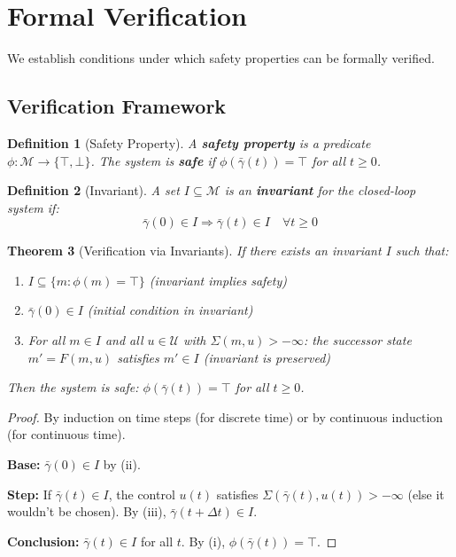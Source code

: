 \documentclass[11pt]{article}
\newtheorem{theorem}{Theorem}[section]
\newtheorem{definition}[theorem]{Definition}
\begin{document}
\section{Formal Verification}

We establish conditions under which safety properties can be formally verified.

\subsection{Verification Framework}

\begin{definition}[Safety Property]
A \textbf{safety property} is a predicate $\phi : \mathcal{M} \to \{\top, \bot\}$. The
system is \textbf{safe} if $\phi(\bar{\gamma}(t)) = \top$ for all $t \geq 0$.
\end{definition}

\begin{definition}[Invariant]
A set $I \subseteq \mathcal{M}$ is an \textbf{invariant} for the closed-loop system if:
\[
\bar{\gamma}(0) \in I \Rightarrow \bar{\gamma}(t) \in I \quad \forall t \geq 0
\]
\end{definition}

\begin{theorem}[Verification via Invariants]
\label{thm:verification}
If there exists an invariant $I$ such that:
\begin{enumerate}
    \item[(i)] $I \subseteq \{m : \phi(m) = \top\}$ (invariant implies safety)
    \item[(ii)] $\bar{\gamma}(0) \in I$ (initial condition in invariant)
    \item[(iii)] For all $m \in I$ and all $u \in \mathcal{U}$ with $\Sigma(m, u) > -\infty$: the successor state $m' = F(m, u)$ satisfies $m' \in I$ (invariant is preserved)
\end{enumerate}
Then the system is safe: $\phi(\bar{\gamma}(t)) = \top$ for all $t \geq 0$.
\end{theorem}

\begin{proof}
By induction on time steps (for discrete time) or by continuous induction (for continuous
time).

\textbf{Base:} $\bar{\gamma}(0) \in I$ by (ii).

\textbf{Step:} If $\bar{\gamma}(t) \in I$, the control $u(t)$ satisfies $\Sigma(\bar{\gamma}(t), u(t)) > -\infty$ (else it wouldn't be chosen).
By (iii), $\bar{\gamma}(t + \Delta t) \in I$.

\textbf{Conclusion:} $\bar{\gamma}(t) \in I$ for all $t$. By (i), $\phi(\bar{\gamma}(t)) = \top$.
\end{proof}
\end{document}
